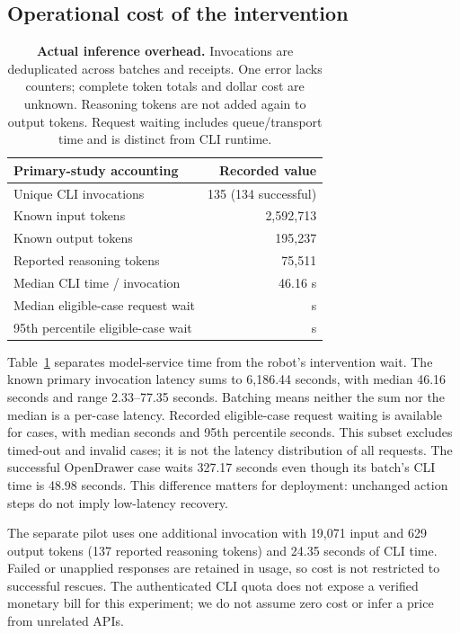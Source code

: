 \documentclass[10pt,twocolumn,letterpaper]{article}
\begin{document}
\subsection{Operational cost of the intervention}
\begin{table}[t]
\centering\small
\begin{tabular}{@{}lr@{}}
\toprule
Primary-study accounting & Recorded value\\
\midrule
Unique CLI invocations &135 (134 successful)\\
Known input tokens &2,592,713\\
Known output tokens &195,237\\
Reported reasoning tokens &75,511\\
Median CLI time / invocation &46.16 s\\
Median eligible-case request wait &\WaitMedian{} s\\
95th percentile eligible-case wait &\WaitPninetyfive{} s\\
\bottomrule
\end{tabular}
\caption{\textbf{Actual inference overhead.} Invocations are deduplicated across batches and receipts. One error lacks counters; complete token totals and dollar cost are unknown. Reasoning tokens are not added again to output tokens. Request waiting includes queue/transport time and is distinct from CLI runtime.}
\label{tab:cost}
\end{table}
Table~\ref{tab:cost} separates model-service time from the robot's intervention wait. The known primary invocation latency sums to 6,186.44 seconds, with median 46.16 seconds and range 2.33--77.35 seconds. Batching means neither the sum nor the median is a per-case latency. Recorded eligible-case request waiting is available for \WaitN{} cases, with median \WaitMedian{} seconds and 95th percentile \WaitPninetyfive{} seconds. This subset excludes timed-out and invalid cases; it is not the latency distribution of all requests. The successful OpenDrawer case waits 327.17 seconds even though its batch's CLI time is 48.98 seconds. This difference matters for deployment: unchanged action steps do not imply low-latency recovery.

The separate pilot uses one additional invocation with 19,071 input and 629 output tokens (137 reported reasoning tokens) and 24.35 seconds of CLI time. Failed or unapplied responses are retained in usage, so cost is not restricted to successful rescues. The authenticated CLI quota does not expose a verified monetary bill for this experiment; we do not assume zero cost or infer a price from unrelated APIs.
\end{document}
